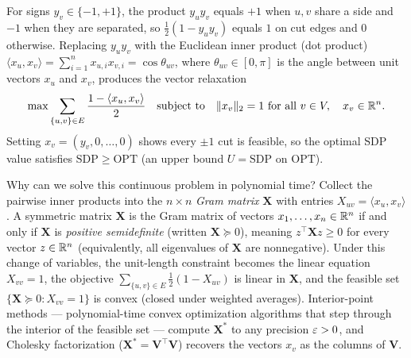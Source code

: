 \begin{intuitionbox}
For signs $y_v\in\{-1,+1\}$, the product $y_u y_v$ equals $+1$ when $u,v$ share a side and $-1$ when
they are separated, so $\tfrac12(1-y_u y_v)$ equals $1$ on cut edges and $0$ otherwise. Replacing $y_u y_v$
with the Euclidean inner product (dot product) $\langle x_u,x_v\rangle = \sum_{i=1}^n x_{u,i}x_{v,i} = \cos\theta_{uv}$,
where $\theta_{uv}\in[0,\pi]$ is the angle between unit vectors $x_u$ and $x_v$, produces the vector relaxation
\[
  \max \sum_{\{u,v\}\in E} \frac{1 - \langle x_u, x_v\rangle}{2}
  \quad\text{subject to}\quad \lVert x_v\rVert_2 = 1 \text{ for all } v\in V,\quad x_v\in\mathbb{R}^n.
\]
Setting $x_v = (y_v, 0, \dots, 0)$ shows every $\pm 1$ cut is feasible, so the optimal SDP value
satisfies $\mathrm{SDP} \ge \mathrm{OPT}$ (an upper bound $U = \mathrm{SDP}$ on $\mathrm{OPT}$).

Why can we solve this continuous problem in polynomial time? Collect the pairwise inner products into the
$n\times n$ \emph{Gram matrix} $\mathbf{X}$ with entries $X_{uv} = \langle x_u, x_v\rangle$. A symmetric
matrix $\mathbf{X}$ is the Gram matrix of vectors $x_1,\dots,x_n\in\mathbb{R}^n$ if and only if $\mathbf{X}$ is
\emph{positive semidefinite} (written $\mathbf{X}\succeq 0$), meaning $z^\top\mathbf{X}z \ge 0$ for every
vector $z\in\mathbb{R}^n$ (equivalently, all eigenvalues of $\mathbf{X}$ are nonnegative). Under this change of
variables, the unit-length constraint becomes the linear equation $X_{vv} = 1$, the objective
$\sum_{\{u,v\}\in E}\tfrac12(1-X_{uv})$ is linear in $\mathbf{X}$, and the feasible set
$\{\mathbf{X}\succeq 0 : X_{vv}=1\}$ is convex (closed under weighted averages). Interior-point methods ---
polynomial-time convex optimization algorithms that step through the interior of the feasible set ---
compute $\mathbf{X}^\ast$ to any precision $\varepsilon>0$, and Cholesky factorization ($\mathbf{X}^\ast = \mathbf{V}^\top\mathbf{V}$)
recovers the vectors $x_v$ as the columns of $\mathbf{V}$.
\end{intuitionbox}

